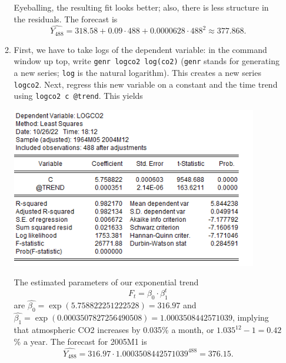 \documentclass[11pt, a4paper]{article}
\begin{document}
\begin{enumerate}
\begin{enumerate}
\begin{center}
\end{center}
Eyeballing, the resulting fit looks better; also, there is less structure in the residuals. The forecast is
\[\widehat{Y_{488}}=318.58+0.09\cdot 488+0.0000628\cdot488^2\approx 377.868.\]
\item First, we have to take logs of the dependent variable: in the command window up top, write \texttt{genr logco2 log(co2)} (\texttt{genr} stands for generating a new series; \texttt{log} is the natural logarithm). This creates a new series \texttt{logco2}. Next, regress this new variable on a constant and the time trend using \verb+logco2 c @trend+. This yields
\begin{center}
\includegraphics[height=7cm]{exponential1}
\end{center}
The estimated parameters of our exponential trend
\[
F_t = \beta_0\cdot\beta_1^t
\]
are $\widehat{\beta_0}=\exp(5.758822251222528)=316.97$ and $\widehat{\beta_1}=\exp(0.0003507827256490508)=1.0003508442571039$, implying that atmospheric CO2 increases by 0.035\% a month, or $1.035^{12}-1=0.42$\% a year. The forecast for 2005M1 is
\[
\widehat{Y_{488}}=316.97\cdot 1.0003508442571039^{488}=376.15.
\]
\end{enumerate}

\end{enumerate}
\end{document}
